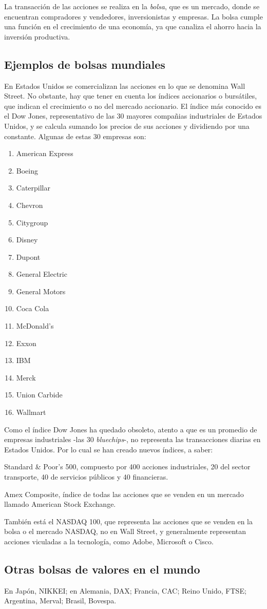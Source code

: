 La transacción de las acciones se realiza en la \emph{bolsa}, 
que es un mercado, 
donde se encuentran compradores y vendedores,
inversionistas y empresas. 
La bolsa cumple una función en el crecimiento de una economía, 
ya que canaliza el ahorro hacia la inversión productiva.

\subsection{Ejemplos de bolsas mundiales}

En Estados Unidos se comercializan las acciones 
en lo que se denomina Wall Street. 
No obstante, 
hay que tener en cuenta los índices accionarios o bursátiles, 
que indican el crecimiento o no del mercado accionario. 
El índice más conocido es el Dow Jones, 
representativo de las 30 mayores compañias industriales de Estados Unidos, 
y se calcula sumando los precios de sus acciones y dividiendo por una constante.
Algunas de estas 30 empresas son:

\begin{enumerate}
    \item American Express
    \item Boeing
    \item Caterpillar
    \item Chevron
    \item Citygroup
    \item Disney
    \item Dupont
    \item General Electric
    \item General Motors
    \item Coca Cola
    \item McDonald's
    \item Exxon
    \item IBM
    \item Merck
    \item Union Carbide
    \item Wallmart
\end{enumerate}

Como el índice Dow Jones ha quedado obsoleto, 
atento a que es un promedio de empresas industriales -las 30 \emph{bluechips}-, 
no representa las transacciones diarias en Estados Unidos. 
Por lo cual se han creado nuevos índices, a saber:

Standard \& Poor's 500, 
compuesto por 400 acciones industriales, 
20 del sector transporte, 
40 de servicios públicos 
y 40 financieras.

Amex Composite, 
índice de todas las acciones 
que se venden en un mercado llamado American Stock Exchange.

También está el NASDAQ 100, 
que representa las acciones que se venden en la bolsa o el mercado NASDAQ, 
no en Wall Street,
y generalmente representan acciones viculadas a la tecnología, 
como Adobe, Microsoft o Cisco.

\subsection{Otras bolsas de valores en el mundo}

En Japón, NIKKEI; en Alemania, DAX; Francia, CAC; Reino Unido, FTSE; Argentina,
Merval; Brasil, Bovespa.
